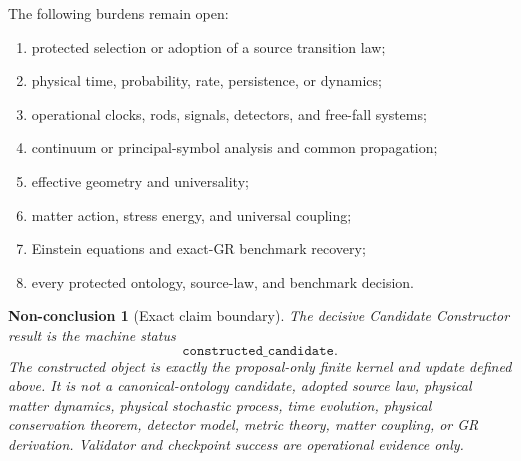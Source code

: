 \documentclass[11pt]{article}
\newtheorem{nonconclusion}{Non-conclusion}
\begin{document}
The following burdens remain open:
\begin{enumerate}[leftmargin=*]
\item protected selection or adoption of a source transition law;
\item physical time, probability, rate, persistence, or dynamics;
\item operational clocks, rods, signals, detectors, and free-fall systems;
\item continuum or principal-symbol analysis and common propagation;
\item effective geometry and universality;
\item matter action, stress energy, and universal coupling;
\item Einstein equations and exact-GR benchmark recovery;
\item every protected ontology, source-law, and benchmark decision.
\end{enumerate}

\begin{nonconclusion}[Exact claim boundary]
The decisive Candidate Constructor result is the machine status
\[
\texttt{constructed\_candidate}.
\]
The constructed object is exactly the
proposal-only finite kernel and update defined above. It is not a
canonical-ontology candidate, adopted source law, physical matter dynamics,
physical stochastic process, time evolution, physical conservation theorem,
detector model, metric theory, matter coupling, or GR derivation. Validator
and checkpoint success are operational evidence only.
\end{nonconclusion}
\end{document}
